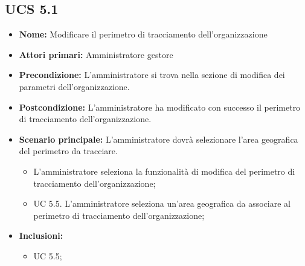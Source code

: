 \subsection{UCS 5.1}%
\begin{itemize}
    \item \textbf{Nome:} Modificare il perimetro di tracciamento dell'organizzazione
    \item \textbf{Attori primari:} Amministratore gestore
    \item \textbf{Precondizione:} L'amministratore si trova nella sezione di modifica dei parametri dell'organizzazione.
    \item \textbf{Postcondizione:} L'amministratore ha modificato con successo il perimetro di tracciamento dell'organizzazione.
    \item \textbf{Scenario principale:} L'amministratore dovrà selezionare l'area geografica del perimetro da tracciare.
    \begin{itemize}%
        \item L'amministratore seleziona la funzionalità di modifica del perimetro di tracciamento dell'organizzazione;
        \item UC 5.5. L'amministratore seleziona un'area geografica da associare al perimetro di tracciamento dell'organizzazione;
    \end{itemize} 
    \item \textbf{Inclusioni:}
    \begin{itemize}
        \item UC 5.5;
    \end{itemize}
\end{itemize}

